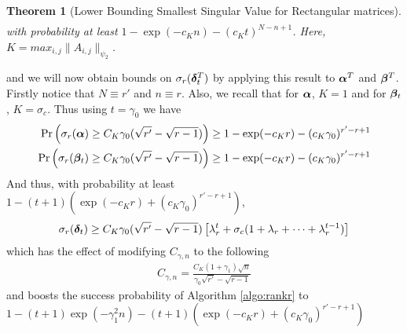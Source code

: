 \documentclass[10pt]{article}
\newtheorem{theorem}{Theorem}
\begin{document}
\begin{enumerate}
\begin{theorem}[Lower Bounding Smallest Singular Value for Rectangular matrices]
\begin{align*}
\end{align*}
with probability at least $1 -  \exp(-c_K n) - (c_Kt)^{N -n +1}$. Here, $K = max_{i,j} \|A_{i,j}\|_{\psi_2}$. 
\end{theorem} 
and we will now obtain bounds on $\sigma_r(\bm{\delta}_t^T)$ by applying this result to $\bm{\alpha}^T$ and $\bm{\beta}^T$. Firstly notice that $N \equiv r'$ and $n \equiv r$. Also, we recall that for $\bm{\alpha}$, $K = 1$ and for $\bm{\beta}_t$, $K = \sigma_c$. Thus using $t = \gamma_0$ we have
\begin{align*}
\Pr\left(\sigma_{r}(\bm{\alpha}) \geq C_K \gamma_0(\sqrt{r'} - \sqrt{r-1})\right) \geq  1 - \exp(-c_Kr) - (c_K \gamma_0)^{r'-r+1} \\
\Pr\left(\sigma_{r}(\bm{\beta}_t) \geq C_K \gamma_0(\sqrt{r'} - \sqrt{r-1})\right) \geq  1 - \exp(-c_Kr) - (c_K \gamma_0)^{r'-r+1}
\end{align*}
And thus, with probability at least $1 - (t+1) (\exp(-c_Kr) + (c_K\gamma_0)^{r' - r + 1})$, 
\begin{align*}
\sigma_r(\bm{\delta}_t) \geq C_K \gamma_0(\sqrt{r'} - \sqrt{r-1}) \left[ \lambda_r^t + \sigma_c (1 + \lambda_r + \cdots + \lambda_r^{t-1})\right]
\end{align*}
which has the effect of modifying $C_{\gamma,n}$ to the following 
\begin{align*}
C_{\gamma,n} = \frac{C_K(1+\gamma_1)\sqrt{n}}{\gamma_0 \sqrt{r'} - \sqrt{r-1}}
\end{align*}
and boosts the success probability of Algorithm \ref{algo:rankr} to $1 - (t + 1) \exp(- \gamma_1^2 n) - (t+1) (\exp(-c_Kr) + (c_K \gamma_0)^{r'-r+1})$
\end{enumerate}
\end{document}
